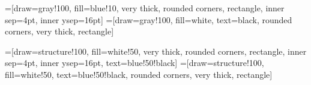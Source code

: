 =[draw=gray!100, fill=blue!10, very thick,
rounded corners, rectangle, inner sep=4pt, inner ysep=16pt]
=[draw=gray!100, fill=white, text=black,
rounded corners, very thick, rectangle]
\newcommand\nicebox[2]{
{\centering
\begin{tikzpicture}
\node [nicebox](box){
\begin{minipage}{0.95\textwidth}\centering
\begin{minipage}{0.95\textwidth}
#2
\end{minipage}\end{minipage}};
\node[niceboxtitle, right=10pt] at (box.north west)
{\small\textbf{#1}};
\end{tikzpicture}\par}
}

=[draw=structure!100, fill=white!50, very thick,
rounded corners, rectangle, inner sep=4pt, inner ysep=16pt, text=blue!50!black]
=[draw=structure!100, fill=white!50, text=blue!50!black,
rounded corners, very thick, rectangle]
\newcommand\modelbox[2]{
{\centering
\begin{tikzpicture}
\node [modelbox](box){
\begin{minipage}{0.95\textwidth}\centering
\begin{minipage}{0.95\textwidth}
#2
\end{minipage}\end{minipage}};
\node[modelboxtitle, right=10pt] at (box.north west)
{\small\textbf{\mbox{#1}}};
\end{tikzpicture}\par}
}

\def\domande{Domande}
\def\approfondimenti{Approfondimenti}
\def\esercizi{Esercizi}
\def\esempi{Esempi svolti}
\def\relazioni{Relazioni}
\def\attivitapratica{Attivit\`a pratica}

